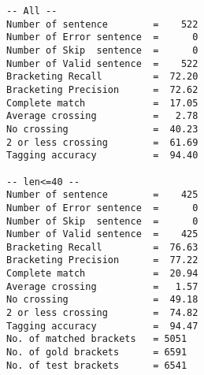\scriptsize
\begin{verbatim}
-- All --
Number of sentence        =    522
Number of Error sentence  =      0
Number of Skip  sentence  =      0
Number of Valid sentence  =    522
Bracketing Recall         =  72.20
Bracketing Precision      =  72.62
Complete match            =  17.05
Average crossing          =   2.78
No crossing               =  40.23
2 or less crossing        =  61.69
Tagging accuracy          =  94.40

-- len<=40 --
Number of sentence        =    425
Number of Error sentence  =      0
Number of Skip  sentence  =      0
Number of Valid sentence  =    425
Bracketing Recall         =  76.63
Bracketing Precision      =  77.22
Complete match            =  20.94
Average crossing          =   1.57
No crossing               =  49.18
2 or less crossing        =  74.82
Tagging accuracy          =  94.47
No. of matched brackets   = 5051
No. of gold brackets      = 6591
No. of test brackets      = 6541
\end{verbatim}

\normalsize

